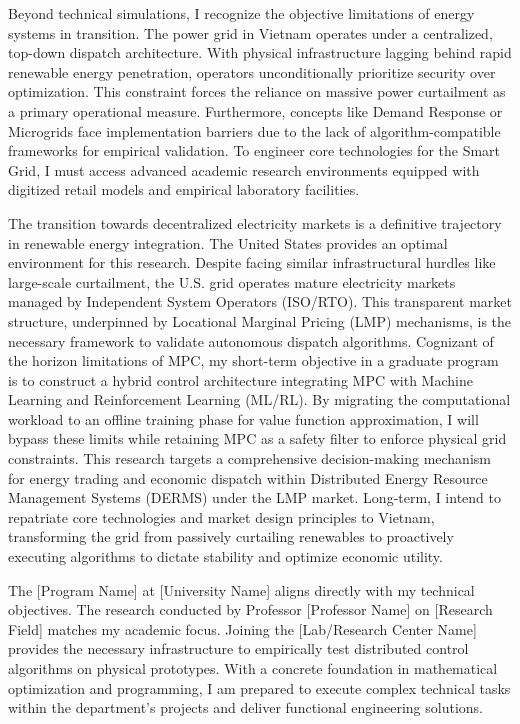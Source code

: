 \documentclass[12pt]{article}
\begin{document}
Beyond technical simulations, I recognize the objective limitations of energy systems in transition. The power grid in Vietnam operates under a centralized, top-down dispatch architecture. With physical infrastructure lagging behind rapid renewable energy penetration, operators unconditionally prioritize security over optimization. This constraint forces the reliance on massive power curtailment as a primary operational measure. Furthermore, concepts like Demand Response or Microgrids face implementation barriers due to the lack of algorithm-compatible frameworks for empirical validation. To engineer core technologies for the Smart Grid, I must access advanced academic research environments equipped with digitized retail models and empirical laboratory facilities.

The transition towards decentralized electricity markets is a definitive trajectory in renewable energy integration. The United States provides an optimal environment for this research. Despite facing similar infrastructural hurdles like large-scale curtailment, the U.S. grid operates mature electricity markets managed by Independent System Operators (ISO/RTO). This transparent market structure, underpinned by Locational Marginal Pricing (LMP) mechanisms, is the necessary framework to validate autonomous dispatch algorithms. Cognizant of the horizon limitations of MPC, my short-term objective in a graduate program is to construct a hybrid control architecture integrating MPC with Machine Learning and Reinforcement Learning (ML/RL). By migrating the computational workload to an offline training phase for value function approximation, I will bypass these limits while retaining MPC as a safety filter to enforce physical grid constraints. This research targets a comprehensive decision-making mechanism for energy trading and economic dispatch within Distributed Energy Resource Management Systems (DERMS) under the LMP market. Long-term, I intend to repatriate core technologies and market design principles to Vietnam, transforming the grid from passively curtailing renewables to proactively executing algorithms to dictate stability and optimize economic utility.

The [Program Name] at [University Name] aligns directly with my technical objectives. The research conducted by Professor [Professor Name] on [Research Field] matches my academic focus. Joining the [Lab/Research Center Name] provides the necessary infrastructure to empirically test distributed control algorithms on physical prototypes. With a concrete foundation in mathematical optimization and programming, I am prepared to execute complex technical tasks within the department's projects and deliver functional engineering solutions.
\end{document}
